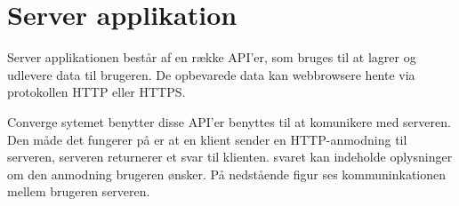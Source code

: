 \section{Server applikation}
Server applikationen består af en række API’er, som bruges til at lagrer og udlevere data til brugeren. De opbevarede data kan webbrowsere hente via protokollen HTTP eller HTTPS. 

Converge sytemet benytter disse API’er benyttes til at komunikere med serveren. Den måde det fungerer på er at en klient sender en HTTP-anmodning til serveren, serveren returnerer et svar til klienten. svaret kan indeholde oplysninger om den anmodning brugeren ønsker. På nedstående figur ses kommuninkationen mellem brugeren serveren.



